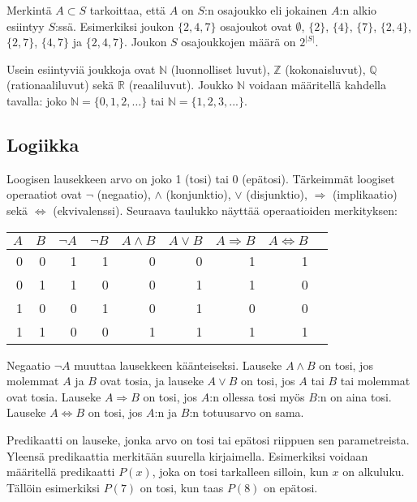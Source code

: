 Merkintä $A \subset S$ tarkoittaa,
että $A$ on $S$:n osajoukko
eli jokainen $A$:n alkio esiintyy $S$:ssä.
Esimerkiksi joukon $\{2,4,7\}$
osajoukot ovat $\emptyset$,
$\{2\}$, $\{4\}$, $\{7\}$, $\{2,4\}$, $\{2,7\}$, $\{4,7\}$ ja $\{2,4,7\}$.
Joukon $S$ osajoukkojen määrä on $2^{|S|}$.

Usein esiintyviä joukkoja ovat
$\mathbb{N}$ (luonnolliset luvut),
$\mathbb{Z}$ (kokonaisluvut),
$\mathbb{Q}$ (rationaaliluvut) sekä
$\mathbb{R}$ (reaaliluvut).
Joukko $\mathbb{N}$ voidaan määritellä
kahdella tavalla: joko $\mathbb{N}=\{0,1,2,\ldots\}$
tai $\mathbb{N}=\{1,2,3,...\}$.

\subsection{Logiikka}

Loogisen lausekkeen arvo on joko 1 (tosi) tai 0 (epätosi).
Tärkeimmät loogiset operaatiot ovat
$\lnot$ (negaatio),
$\land$ (konjunktio),
$\lor$ (disjunktio),
$\Rightarrow$ (implikaatio) sekä
$\Leftrightarrow$ (ekvivalenssi).
Seuraava taulukko näyttää operaatioiden merkityksen:

\begin{center}
\begin{tabular}{rr|rrrrrrr}
$A$ & $B$ & $\lnot A$ & $\lnot B$ & $A \land B$ & $A \lor B$ & $A \Rightarrow B$ & $A \Leftrightarrow B$ \\
\hline
0 & 0 & 1 & 1 & 0 & 0 & 1 & 1 \\
0 & 1 & 1 & 0 & 0 & 1 & 1 & 0 \\
1 & 0 & 0 & 1 & 0 & 1 & 0 & 0 \\
1 & 1 & 0 & 0 & 1 & 1 & 1 & 1 \\
\end{tabular}
\end{center}

Negaatio $\lnot A$ muuttaa lausekkeen käänteiseksi.
Lauseke $A \land B$ on tosi, jos molemmat $A$ ja $B$ ovat tosia,
ja lauseke $A \lor B$ on tosi, jos $A$ tai $B$ tai molemmat
ovat tosia.
Lauseke $A \Rightarrow B$ on tosi,
jos $A$:n ollessa tosi myös $B$:n on aina tosi.
Lauseke $A \Leftrightarrow B$ on tosi,
jos $A$:n ja $B$:n totuusarvo on sama.

Predikaatti on lauseke, jonka arvo on tosi tai epätosi
riippuen sen parametreista.
Yleensä predikaattia merkitään suurella kirjaimella.
Esimerkiksi voidaan määritellä predikaatti $P(x)$,
joka on tosi tarkalleen silloin, kun $x$ on alkuluku.
Tällöin esimerkiksi $P(7)$ on tosi, kun taas $P(8)$ on epätosi.

